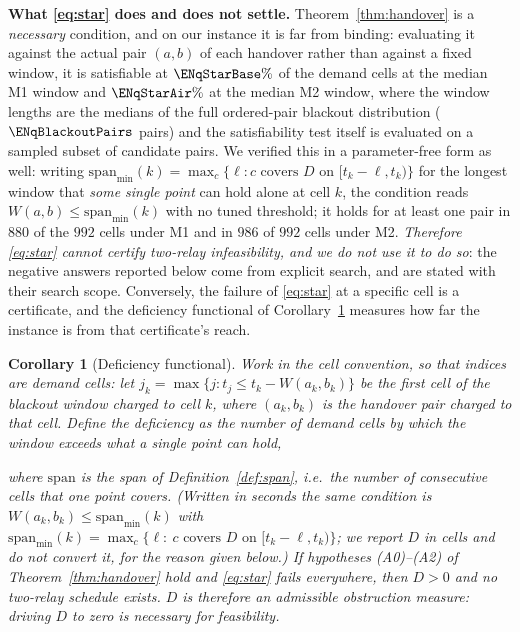 \documentclass[11pt]{article}
\newcommand{\eqfit}[1]{%
  \par\nobreak
  \begin{center}%
  \resizebox{\ifdim\width>\linewidth\linewidth\else\width\fi}{!}{$\displaystyle #1$}%
  \end{center}%
  \par\nobreak
}
\theoremstyle{dshplain}
\newtheorem{corollary}[theorem]{Corollary}
\theoremstyle{dshdefn}
\begin{document}
\noindent\textbf{What \eqref{eq:star} does and does not settle.}
Theorem~\ref{thm:handover} is a \emph{necessary} condition, and on our instance it
is far from binding: evaluating it against the actual pair $(a,b)$ of each
handover rather than against a fixed window, it is satisfiable at
$\ENqStarBase\%$ of the demand cells at the median M1 window and
$\ENqStarAir\%$ at the median M2 window, where the window lengths are the medians
of the full ordered-pair blackout distribution ($\ENqBlackoutPairs$ pairs) and the
satisfiability test itself is evaluated on a sampled subset of candidate pairs. We verified this in a
parameter-free form as well: writing
$\mathrm{span}_{\min}(k)=\max_{c}\{\ell: c \text{ covers } D \text{ on }
[t_k-\ell,t_k)\}$ for the longest window that \emph{some single point} can hold
alone at cell $k$, the condition reads $W(a,b)\le\mathrm{span}_{\min}(k)$ with no
tuned threshold; it holds for at least one pair in $880$ of the $992$ cells under
M1 and in $986$ of $992$ cells under M2. \emph{Therefore \eqref{eq:star} cannot
certify two-relay infeasibility, and we do not use it to do so}: the negative
answers reported below come from explicit search, and are stated with their search
scope. Conversely, the failure of \eqref{eq:star} at a specific cell is a
certificate, and the deficiency functional of
Corollary~\ref{cor:deficiency} measures how far the instance is from that
certificate's reach.

\begin{corollary}[Deficiency functional]
\label{cor:deficiency}
Work in the cell convention, so that indices are demand cells: let
$j_k=\max\{j:t_j\le t_k-W(a_k,b_k)\}$ be the first cell of the blackout window
charged to cell $k$, where $(a_k,b_k)$ is the handover pair charged to that cell.
Define the deficiency as the number of demand cells by which the window exceeds
what a single point can hold,
\eqfit{
D=\sum_{k}\max\bigl(0,\ (k-j_k+1)-\mathrm{span}(j_k)\bigr),
}
where $\mathrm{span}$ is the span of Definition~\ref{def:span}, i.e.\ the number
of consecutive cells that \emph{one} point covers. (Written in seconds the same
condition is $W(a_k,b_k)\le\mathrm{span}_{\min}(k)$ with
$\mathrm{span}_{\min}(k)=\max_{c}\{\ell:\ c \text{ covers } D \text{ on }
[t_k-\ell,t_k)\}$; we report $D$ in cells and do not convert it, for the reason
given below.) If hypotheses (A0)--(A2) of
Theorem~\ref{thm:handover} hold and \eqref{eq:star} fails everywhere, then
$D>0$ \emph{and} no two-relay schedule exists. $D$ is therefore an admissible
\emph{obstruction measure}: driving $D$ to zero is necessary for feasibility.
\end{corollary}
\end{document}
